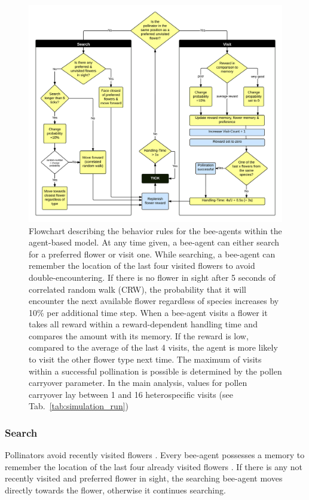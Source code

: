 \begin{figure} [!ht] %
	\centering
	\includegraphics[width=15cm]{Images/flowchart-model}
	\caption{Flowchart describing the behavior rules for the bee-agents within the agent-based model. At any time given, a bee-agent can either search for a preferred flower or visit one. While searching, a bee-agent can remember the location of the last four visited flowers to avoid double-encountering. If there is no flower in sight after 5 seconds of correlated random walk (CRW), the probability that it will encounter the next available flower regardless of species increases by 10\% per additional time step. When a bee-agent visits a flower it takes all reward within a reward-dependent handling time and compares the amount with its memory. If the reward is low, compared to the average of the last 4 visits, the agent is more likely to visit the other flower type next time. The maximum of visits within a successful pollination is possible is determined by the pollen carryover parameter. In the main analysis, values for pollen carryover lay between 1 and 16 heterospecific visits (see Tab.~\ref{tab:simulation_run})}
	\label{fig:flowchart}
\end{figure}


\subsubsection*{Search}
Pollinators avoid recently visited flowers \citep{goulson1999foraging}. Every bee-agent possesses a memory to remember the location of the last four already visited flowers \citep{goulson2000pollinators}. If there is any not recently visited and preferred flower in sight, the searching bee-agent moves directly towards the flower, otherwise it continues searching. 

